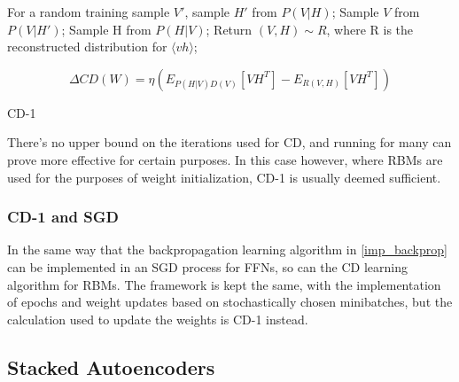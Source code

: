 \documentclass[a4paper,11pt,oneside]{article}
\theoremstyle{plain}
\theoremstyle{definition}
\begin{document}
\begin{algorithm}[H]
	
	\texttt{}\newline
	
	For a random training sample $V'$, sample $H'$ from $P(V|H)$;\newline
	Sample $V$ from $P(V|H')$;\newline
	Sample H from $P(H|V)$;\newline
	Return $(V,H) \sim R $, where R is the reconstructed distribution for $\langle vh \rangle$;\newline
	
	 
	\begin{equation}
	\Delta CD(W) = \eta( E_{P(H|V)D(V)}[VH^T] - E_{R(V,H)}[VH^T])
	\end{equation}
	
	
	
	\label{algo_cd1}
	\caption{CD-1}
\end{algorithm}

There's no upper bound on the iterations used for CD, and running for many can prove more effective for certain purposes. In this case however, where RBMs are used for the purposes of weight initialization, CD-1 is usually deemed sufficient.

\subsubsection{CD-1 and SGD}

In the same way that the backpropagation learning algorithm in \ref{imp_backprop} can be implemented in an SGD process for FFNs, so can the CD learning algorithm for RBMs. The framework is kept the same, with the implementation of epochs and weight updates based on stochastically chosen minibatches, but the calculation used to update the weights is CD-1 instead.


\subsection{Stacked Autoencoders}\label{imp_SAE}
\end{document}

